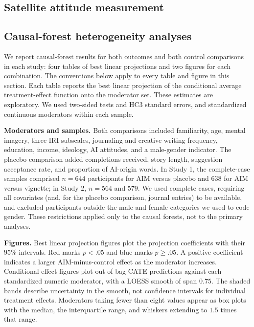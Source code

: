 \documentclass[11pt]{article}
\begin{document}
\subsection{Satellite attitude measurement}
\label{sec:si-satellite-cfa}


\subsection{Causal-forest heterogeneity analyses}
\label{sec:si-moderators}
We report causal-forest results for both outcomes and both control comparisons in
each study: four tables of best linear projections and two figures for each
combination. The conventions below apply to every table and figure in this
section. Each table reports the best linear projection of the conditional average
treatment-effect function onto the moderator set. These estimates are
exploratory. We used two-sided tests and HC3 standard errors, and standardized
continuous moderators within each sample.

\textbf{Moderators and samples.} Both comparisons included familiarity, age,
mental imagery, three IRI subscales, journaling and creative-writing frequency,
education, income, ideology, AI attitudes, and a male-gender
indicator. The placebo comparison added completions received, story length,
suggestion acceptance rate, and proportion of AI-origin words. In Study 1, the
complete-case samples comprised $n=644$ participants for AIM versus placebo and
$638$ for AIM versus vignette; in Study 2, $n=564$ and $579$. We used
complete cases, requiring all covariates (and, for the placebo comparison, journal entries) to be available, and excluded participants outside the male and female
categories we used to code gender. These restrictions applied only to the causal
forests, not to the primary analyses.

\textbf{Figures.} Best linear projection figures plot the projection
coefficients with their $95\%$ intervals. Red marks $p<.05$ and blue marks
$p\geq.05$. A positive coefficient indicates a larger AIM-minus-control effect as
the moderator increases. Conditional effect figures plot out-of-bag CATE
predictions against each standardized numeric moderator, with a LOESS smooth of
span $0.75$. The shaded bands describe uncertainty in the smooth, not confidence
intervals for individual treatment effects. Moderators taking fewer than eight
values appear as box plots with the median, the interquartile range, and whiskers
extending to $1.5$ times that range.
\end{document}
